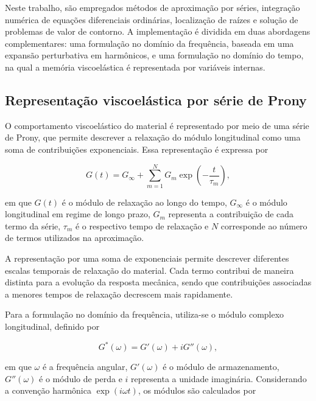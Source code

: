 \documentclass[arial,centeredequations,english,brazilian,oneside,section=TITLE]{ifes8}
\begin{document}
Neste trabalho, são empregados métodos de aproximação por séries,
integração numérica de equações diferenciais ordinárias, localização
de raízes e solução de problemas de valor de contorno. A implementação
é dividida em duas abordagens complementares: uma formulação no
domínio da frequência, baseada em uma expansão perturbativa em
harmônicos, e uma formulação no domínio do tempo, na qual a memória
viscoelástica é representada por variáveis internas.

\subsection{Representação viscoelástica por série de Prony}
\label{subsec:serie-prony}

O comportamento viscoelástico do material é representado por meio de
uma série de Prony, que permite descrever a relaxação do módulo
longitudinal como uma soma de contribuições exponenciais. Essa
representação é expressa por

\begin{equation}
  G(t) = G_{\infty} +
  \sum_{m=1}^{N} G_m \exp\left(-\frac{t}{\tau_m}\right),
  \label{eq:prony-relaxacao}
\end{equation}

em que $G(t)$ é o módulo de relaxação ao longo do tempo, $G_{\infty}$
é o módulo longitudinal em regime de longo prazo, $G_m$ representa
a contribuição de cada termo da série, $\tau_m$ é o respectivo tempo
de relaxação e $N$ corresponde ao número de termos utilizados na
aproximação.

A representação por uma soma de exponenciais permite descrever
diferentes escalas temporais de relaxação do material. Cada termo
contribui de maneira distinta para a evolução da resposta mecânica,
sendo que contribuições associadas a menores tempos de relaxação
decrescem mais rapidamente.

Para a formulação no domínio da frequência, utiliza-se o módulo
complexo longitudinal, definido por

\begin{equation}
  G^*(\omega) = G'(\omega) + iG''(\omega),
  \label{eq:modulo-complexo}
\end{equation}

em que $\omega$ é a frequência angular, $G'(\omega)$ é o módulo de
armazenamento, $G''(\omega)$ é o módulo de perda e $i$ representa a
unidade imaginária. Considerando a convenção harmônica
$\exp(i\omega t)$, os módulos são calculados por
\end{document}
